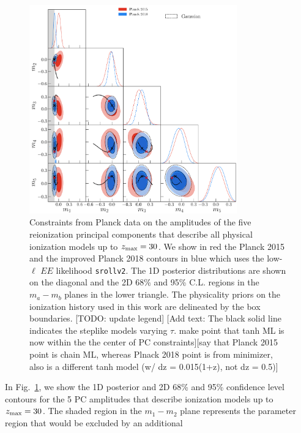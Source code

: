 \documentclass[prd,twocolumn,amsmath,amssymb,floatfix,superscriptaddress,nofootinbib]{revtex4-1}
\newcommand{\zmax}{z_{\rm max}}
\begin{document}
\begin{figure}
\includegraphics[width=0.8\textwidth]{paper/plots/plot_mj_triangle_t18_r12_t19_t20_vs_pl18_pc_zmax30_pliklite_srollv2_1015_wTauTrajectory_pl15_wTanhML_wGaussEllipse.pdf}

\caption{Constraints from Planck data on the amplitudes of the five reionization principal components that describe all physical ionization models up to $z_{\rm max} = 30$. We show in red the Planck 2015 and the improved Planck 2018 contours in blue which uses the low-$\ell$ $EE$ likelihood \texttt{srollv2}. The 1D posterior distributions are shown on the diagonal and the 2D 68\% and 95\% C.L. regions in the $m_a-m_b$ planes in the lower triangle. The physicality priors on the ionization history used in this work are delineated by the box boundaries. [TODO: update legend] [Add text: The black solid line indicates the steplike models varying $\tau$. make point that tanh ML is now within the the center of PC constraints][say that Planck 2015 point is chain ML, whereas Plnack 2018 point is from minimizer, also is a different tanh model (w/ dz = 0.015(1+z), not dz = 0.5)]}
\label{fig:plot_mjs_2018_vs_2015}
\end{figure}
%
In Fig.~\ref{fig:plot_mjs_2018_vs_2015}, we show the 1D posterior and 2D 68\% and 95\% confidence level contours for the 5 PC amplitudes that describe ionization models up to $\zmax=30$. The shaded region in the $m_1-m_2$ plane represents the parameter region that would be excluded by an additional 
\end{document}
